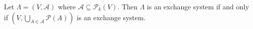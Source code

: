 Let $\Lambda = (V, \mathcal{A})$ where $\mathcal{A} \subseteq \mathcal{P}_k(V)$. Then $\Lambda$ is an exchange system if and only if $(V, \bigcup_{A \in \mathcal{A}} \mathcal{P}(A))$ is an exchange system.
